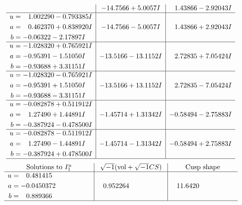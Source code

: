 \documentclass[1p]{elsarticle_modified}
\theoremstyle{definition}
\newcommand{\I}{\sqrt{-1}}
\begin{document}
$$\begin{array}{c|c|c}
 & -14.7566 + 5.0057 I & \phantom{-}1.43866 - 2.92043 I \\ \hline\begin{aligned}
u &= \phantom{-}1.002290 - 0.793385 I \\
a &= \phantom{-}0.462370 + 0.838920 I \\
b &= -0.06322 - 2.17897 I\end{aligned}
 & -14.7566 - 5.0057 I & \phantom{-}1.43866 + 2.92043 I \\ \hline\begin{aligned}
u &= -1.028320 + 0.765921 I \\
a &= -0.95391 - 1.51050 I \\
b &= -0.93688 + 3.31151 I\end{aligned}
 & -13.5166 - 13.1152 I & \phantom{-}2.72835 + 7.05424 I \\ \hline\begin{aligned}
u &= -1.028320 - 0.765921 I \\
a &= -0.95391 + 1.51050 I \\
b &= -0.93688 - 3.31151 I\end{aligned}
 & -13.5166 + 13.1152 I & \phantom{-}2.72835 - 7.05424 I \\ \hline\begin{aligned}
u &= -0.082878 + 0.511912 I \\
a &= \phantom{-}1.27490 + 1.44891 I \\
b &= -0.387924 - 0.478500 I\end{aligned}
 & -1.45714 + 1.31342 I & -0.58494 - 2.75883 I \\ \hline\begin{aligned}
u &= -0.082878 - 0.511912 I \\
a &= \phantom{-}1.27490 - 1.44891 I \\
b &= -0.387924 + 0.478500 I\end{aligned}
 & -1.45714 - 1.31342 I & -0.58494 + 2.75883 I\\
 \hline 
 \end{array}$$\newpage$$\begin{array}{c|c|c}  
\text{Solutions to }I^u_{1}& \I (\text{vol} + \sqrt{-1}CS) & \text{Cusp shape}\\
 \hline 
\begin{aligned}
u &= \phantom{-}0.481415\phantom{ +0.000000I} \\
a &= -0.0450372\phantom{ +0.000000I} \\
b &= \phantom{-}0.889366\phantom{ +0.000000I}\end{aligned}
 & \phantom{-}0.952264\phantom{ +0.000000I} & \phantom{-}11.6420\phantom{ +0.000000I}\\
 \hline 
 \end{array}$$\newpage\newpage\renewcommand{\arraystretch}{1}
\end{document}
